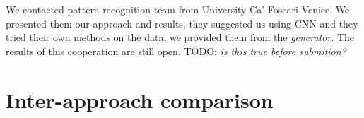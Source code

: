 \documentclass[
  print, %
  Table,   %
  nolof,     %
  nolot,     %
  11pt, %
  oneside  %
]{fithesis3}
\newcommand{\todo}[1]{TODO: \textit{#1}}
\begin{document}
We contacted pattern recognition team from University Ca’ Foscari Venice. We presented them our approach and results, they suggested us using CNN and they tried their own methods on the data, we provided them from the \textit{generator}. The results of this cooperation are still open. \todo{is this true before submition?}









\section{Inter-approach comparison}
\label{sec:res-comp}
\end{document}
